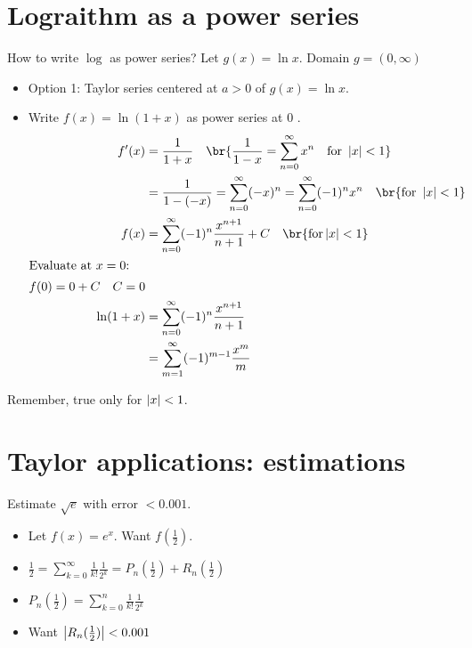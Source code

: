 \newpage
\section{Lograithm as a power series}
How to write \(\log\) as power series?
Let \(g(x) = \ln x\). Domain \(g=(0, \infty)\)
\begin{itemize}
\item Option 1: Taylor series centered at \(a > 0\) of \(g(x) = \ln x\).
  \item Write \(f(x) = \ln (1+x)\) as power series at \(0\) .
    \begin{align*}
      f'(x)&= \frac{1}{1+x} \quad \br{\frac{1}{1-x} = \sum_{n = 0}^{\infty} x^{n} \quad \text{for } \abs{x} < 1 }\\
       &= \frac{1}{1-(-x)} = \sum_{n = 0 }^{\infty} (-x)^{n}  = \sum_{n = 0}^{\infty} (-1)^{n} x^{n} \quad \br{\text{for } \abs{x} < 1  }\\
      f(x) &= \sum_{n = 0}^{\infty} (-1)^{n} \frac{x^{n+1}}{n+1} + C \quad \br{\text{for} \abs{x} < 1}\\
      \intertext{Evaluate at \(x = 0\):}
      f(0) = 0 + C \quad C = 0 \\
      \ln (1+x) & = \sum_{n = 0}^{\infty} (-1)^{n} \frac{x^{n+1}}{n+1}\\
           & = \sum_{m = 1}^{\infty} (-1)^{m - 1} \frac{x^{m}}{m}
    \end{align*}
\end{itemize}
Remember, true only for \(\left\lvert x \right\rvert < 1\).




\newpage
\section*{Taylor applications: estimations}
\eg Estimate \(\sqrt{e}\) with error  \(< 0.001\).
\begin{itemize}
    \item Let \(f(x) = e^{x}\). Want \(f(\frac{1}{2})\).
    \item \(\frac{1}{2} = \sum_{k = 0}^{\infty} \frac{1}{k!}\frac{1}{2^{k}} = P_{n} (\frac{1}{2}) + R_{n}(\frac{1}{2})\)
    \item \(P_{n}(\frac{1}{2}) = \sum_{k = 0}^n \frac{1}{k!} \frac{1}{2^{k}}\)
        \item Want \(\left\lvert R_{n}(\frac{1}{2}) \right\rvert< 0.001\)

\end{itemize}
